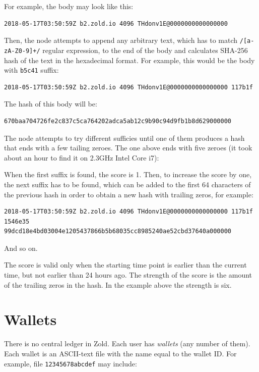 \documentclass[11pt,oneside]{article}
\newcommand\dd[1]{\colorbox{gray!30}{\texttt{#1}}}
\begin{document}
For example, the body may look like this:

\begin{verbatim}
2018-05-17T03:50:59Z b2.zold.io 4096 THdonv1E@0000000000000000
\end{verbatim}

Then, the node attempts to append any arbitrary text, which has to match
\dd{/[a-zA-Z0-9]+/} regular expression, to the end of the body and calculates
SHA-256 hash of the text in the hexadecimal format. For example, this would be the body
with \dd{b5c41} suffix:

\begin{verbatim}
2018-05-17T03:50:59Z b2.zold.io 4096 THdonv1E@0000000000000000 117b1f
\end{verbatim}

The hash of this body will be:

\begin{verbatim}
670baa704726fe2c837c5ca764202adca5ab12c9b90c94d9fb1b8d629000000
\end{verbatim}

The node attempts to try different sufficies until one of them produces
a hash that ends with a few tailing zeroes. The one above ends
with five zeroes
(it took about an hour to find it on 2.3GHz Intel Core i7):

When the first suffix is found, the score is 1. Then, to
increase the score by one, the next suffix has to be found, which
can be added to the first 64 characters of the previous hash
in order to obtain a new hash with trailing zeros, for example:

\begin{verbatim}
2018-05-17T03:50:59Z b2.zold.io 4096 THdonv1E@0000000000000000 117b1f 1546e35
99dcd18e4bd03004e1205437866b5b68035cc8985240ae52cbd37640a000000
\end{verbatim}

And so on.

The score is valid only when the starting time point is earlier than
the current time, but not earlier than 24 hours ago. The strength of the score
is the amount of the trailing zeros in the hash. In the example above the
strength is six.

\section{Wallets}

There is no central ledger in Zold.
Each user has \emph{wallets} (any number of them).
Each wallet is an ASCII-text file with the name equal to the wallet ID.
For example, file \dd{12345678abcdef} may include:
\end{document}
